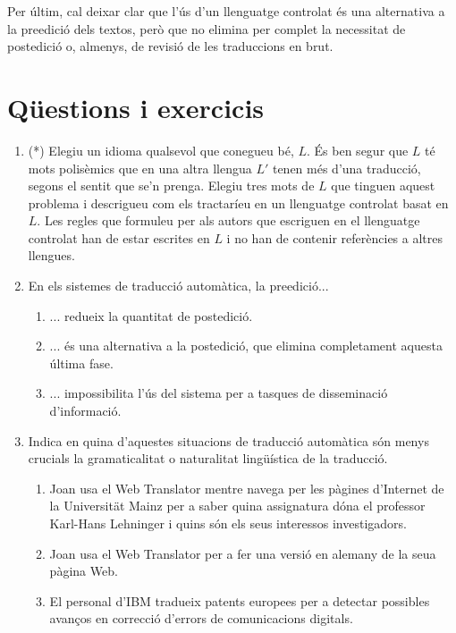 Per últim, cal deixar clar que l'ús d'un llenguatge controlat és una
alternativa a la preedició dels textos, però que no elimina per
complet la necessitat de postedició o, almenys, de revisió de les
traduccions en brut.

\section{Qüestions i exercicis}
\begin{enumerate}
\item(*) Elegiu un idioma qualsevol que conegueu bé, $L$. És ben segur
  que $L$ té mots polisèmics que en una altra llengua $L'$ tenen més
  d'una traducció, segons el sentit que se'n prenga. Elegiu tres mots
  de $L$ que tinguen aquest problema i descrigueu com els tractaríeu
  en un llenguatge controlat basat en $L$. Les regles que formuleu per
  als autors que escriguen en el llenguatge controlat han de estar
  escrites en $L$ i no han de contenir referències a altres llengues.

\item En els sistemes de traducció automàtica, la preedició...
  \begin{enumerate}
  \item ... redueix la quantitat de postedició.
  \item ... és una alternativa a la postedició, que elimina
    completament aquesta última fase.
  \item ... impossibilita l'ús del sistema per a tasques de
    disseminació d'informació.
 \end{enumerate}

\item Indica en quina d'aquestes situacions de traducció automàtica
  són menys crucials la gramaticalitat o naturalitat lingüística de la
  traducció.
  \begin{enumerate}
  \item Joan usa el Web Translator mentre navega per les pàgines
    d'Internet de la Universität Mainz per a saber quina assignatura
    dóna el professor Karl-Hans Lehninger i quins són els seus
    interessos investigadors.
  \item Joan usa el Web Translator per a fer una versió en alemany de
    la seua pàgina Web.
  \item El personal d'IBM tradueix patents europees per a detectar
    possibles avanços en correcció d'errors de comunicacions digitals.
  \end{enumerate}


\end{enumerate}
